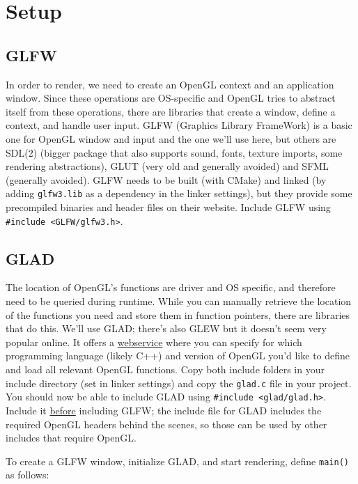 \documentclass[8pt, table, xcdraw]{article}%
\begin{document}
\section{Setup}

\subsection{GLFW}

In order to render, we need to create an OpenGL context and an application window. Since these operations are OS-specific and OpenGL tries to abstract itself from these operations, there are libraries that create a window, define a context, and handle user input. GLFW (Graphics Library FrameWork) is a basic one for OpenGL window and input and the one we'll use here, but others are SDL(2) (bigger package that also supports sound, fonts, texture imports, some rendering abstractions), GLUT (very old and generally avoided) and SFML (generally avoided). GLFW needs to be built (with CMake) and linked (by adding \lstinline{glfw3.lib} as a dependency in the linker settings), but they provide some precompiled binaries and header files on their website. Include GLFW using \lstinline{#include <GLFW/glfw3.h>}.

\subsection{GLAD}

The location of OpenGL's functions are driver and OS specific, and therefore need to be queried during runtime. While you can manually retrieve the location of the functions you need and store them in function pointers, there are libraries that do this. We'll use GLAD; there's also GLEW but it doesn't seem very popular online. It offers a \href{https://glad.dav1d.de}{webservice} where you can specify for which programming language (likely C++) and version of OpenGL you'd like to define and load all relevant OpenGL functions. Copy both include folders in your include directory (set in linker settings) and copy the \lstinline{glad.c} file in your project. You should now be able to include GLAD using \lstinline{#include <glad/glad.h>}. Include it \underline{before} including GLFW; the include file for GLAD includes the required OpenGL headers behind the scenes, so those can be used by other includes that require OpenGL.

To create a GLFW window, initialize GLAD, and start rendering, define \lstinline{main()} as follows:
\end{document}
